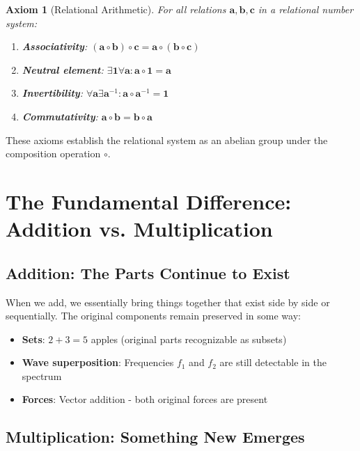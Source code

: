 \documentclass[11pt,a4paper]{article}
\newcommand{\primrel}[1]{\mathbf{#1}}
\newtheorem{axiom}{Axiom}[section]
\begin{document}
	\begin{axiom}[Relational Arithmetic]
		For all relations $\primrel{a}, \primrel{b}, \primrel{c}$ in a relational number system:
		\begin{enumerate}
			\item \textbf{Associativity}: $(\primrel{a} \circ \primrel{b}) \circ \primrel{c} = \primrel{a} \circ (\primrel{b} \circ \primrel{c})$
			\item \textbf{Neutral element}: $\exists \primrel{1} \forall \primrel{a}: \primrel{a} \circ \primrel{1} = \primrel{a}$
			\item \textbf{Invertibility}: $\forall \primrel{a} \exists \primrel{a}^{-1}: \primrel{a} \circ \primrel{a}^{-1} = \primrel{1}$
			\item \textbf{Commutativity}: $\primrel{a} \circ \primrel{b} = \primrel{b} \circ \primrel{a}$
		\end{enumerate}
	\end{axiom}
	
	These axioms establish the relational system as an abelian group under the composition operation $\circ$.
	
	\section{The Fundamental Difference: Addition vs. Multiplication}
	
	\subsection{Addition: The Parts Continue to Exist}
	
	When we add, we essentially bring things together that exist side by side or sequentially. The original components remain preserved in some way:
	
	\begin{itemize}
		\item \textbf{Sets}: $2 + 3 = 5$ apples (original parts recognizable as subsets)
		\item \textbf{Wave superposition}: Frequencies $f_1$ and $f_2$ are still detectable in the spectrum
		\item \textbf{Forces}: Vector addition - both original forces are present
	\end{itemize}
	
	\subsection{Multiplication: Something New Emerges}
	
\end{document}
